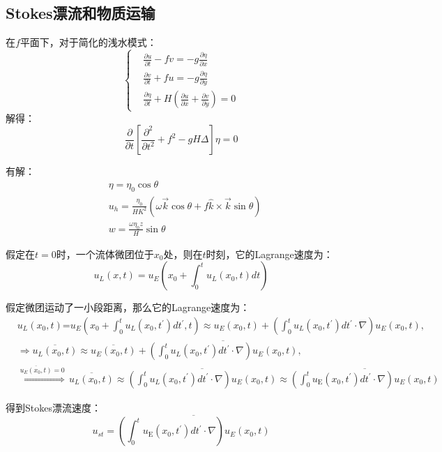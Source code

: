 \documentclass{article}
\begin{document}
\subsection{Stokes漂流和物质运输}
在$f$平面下，对于简化的浅水模式：
$$\begin{cases}
    &\frac{\partial u}{\partial t}-fv=-g\frac{\partial \eta}{\partial x}\\
    &\frac{\partial v}{\partial t}+fu=-g\frac{\partial \eta}{\partial y}\\
    &\frac{\partial \eta}{\partial t}+H(\frac{\partial u}{\partial x}+\frac{\partial v}{\partial y} ) = 0
\end{cases}$$
解得：
$$\frac{\partial }{\partial t}\left[\frac{\partial^2 }{\partial t^2}+f^2-gH\Delta\right]\eta=0 $$

有解：
\begin{align}
    &\eta = \eta_0\cos\theta \\
    &u_h = \frac{\eta_0}{HK^2}(\omega\vec{k}\cos\theta + f\hat{k}\times\vec{k}\sin\theta)\\
    &w = \frac{\omega\eta_0z}{H}\sin\theta
\end{align}

假定在$t=0$时，一个流体微团位于$x_0$处，则在$t$时刻，它的Lagrange速度为：
$$u_L(x,t) = u_E(x_0 + \int_0^t u_L(x_0, t) dt)$$

假定微团运动了一小段距离，那么它的Lagrange速度为：
\begin{align}
  & {{u}_{L}}({{x}_{0}},t)\text{=}{{u}_{E}}({{x}_{0}}+\int_{0}^{t}{{{u}_{L}}({{x}_{0}},t^{\prime})}dt^{\prime},t)\approx {{u}_{E}}({{x}_{0}},t)+(\int_{0}^{t}{{{u}_{L}}({{x}_{0}},t^{\prime})}dt^{\prime}\cdot \nabla ){{u}_{E}}({{x}_{0}},t), \\ 
 & \Rightarrow \overline{{{u}_{L}}({{x}_{0}},t)}\approx \overline{{{u}_{E}}({{x}_{0}},t)}+\overline{(\int_{0}^{t}{{{u}_{L}}({{x}_{0}},t^{\prime})}dt^{\prime}\cdot \nabla ){{u}_{E}}({{x}_{0}},t)}, \\ 
 & \overset{\overline{{{u}_{E}}({{x}_{0}},t)}=0}{\mathop{\Rightarrow }}\,\overline{{{u}_{L}}({{x}_{0}},t)}\approx \overline{(\int_{0}^{t}{{{u}_{L}}({{x}_{0}},t^{\prime})}dt^{\prime}\cdot \nabla ){{u}_{E}}({{x}_{0}},t)}\approx \overline{(\int_{0}^{t}{{{u}_{\text{E}}}({{x}_{0}},t^{\prime})}dt^{\prime}\cdot \nabla ){{u}_{E}}({{x}_{0}},t)}
\end{align}

得到Stokes漂流速度：
$$u_{st}=\overline{(\int_{0}^{t}{{{u}_{\text{E}}}({{x}_{0}},t^{\prime})}dt^{\prime}\cdot \nabla ){{u}_{E}}({{x}_{0}},t)}$$
\end{document}
